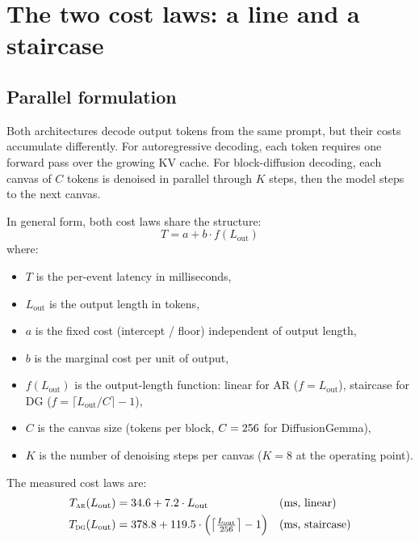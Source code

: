 \section{The two cost laws: a line and a staircase}
\label{sec:laws}

\subsection{Parallel formulation}

Both architectures decode output tokens from the same prompt, but their
costs accumulate differently. For autoregressive decoding, each token
requires one forward pass over the growing KV cache. For block-diffusion
decoding, each canvas of $C$ tokens is denoised in parallel through $K$
steps, then the model steps to the next canvas.

In general form, both cost laws share the structure:
\begin{equation}
\label{eq:general}
T = a + b \cdot f(L_{\mathrm{out}})
\end{equation}
where:
\begin{itemize}[nosep]
\item $T$ is the per-event latency in milliseconds,
\item $L_{\mathrm{out}}$ is the output length in tokens,
\item $a$ is the fixed cost (intercept / floor) independent of output
  length,
\item $b$ is the marginal cost per unit of output,
\item $f(L_{\mathrm{out}})$ is the output-length function: linear for
  AR ($f = L_{\mathrm{out}}$), staircase for DG
  ($f = \lceil L_{\mathrm{out}}/C \rceil - 1$),
\item $C$ is the canvas size (tokens per block, $C = 256$ for
  DiffusionGemma),
\item $K$ is the number of denoising steps per canvas ($K = 8$ at the
  operating point).
\end{itemize}

The measured cost laws are:
\begin{align}
\label{eq:ar}
T_{\textsc{ar}}(L_{\mathrm{out}}) &= 34.6 + 7.2 \cdot L_{\mathrm{out}} && \text{(ms, linear)} \\
\label{eq:dg}
T_{\textsc{dg}}(L_{\mathrm{out}}) &= 378.8 + 119.5 \cdot \Bigl(\bigl\lceil \tfrac{L_{\mathrm{out}}}{256}\bigr\rceil - 1\Bigr) && \text{(ms, staircase)}
\end{align}

